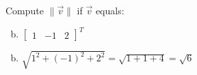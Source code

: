 \documentclass[../main.tex]{subfiles}
\begin{document}
Compute $\|\vec{v}\|$ if $\vec{v}$ equals:
\begin{enumerate}[a)]
	\setcounter{enumi}{1}
	\item $\begin{bmatrix}1&-1&2\end{bmatrix}^T$
\end{enumerate}

\solution
\begin{enumerate}[a)]
	\setcounter{enumi}{1}
	\item $\sqrt{1^2 + (-1)^2 + 2^2} = \sqrt{1 + 1 + 4} = \sqrt{6}$
\end{enumerate}
\end{document}
